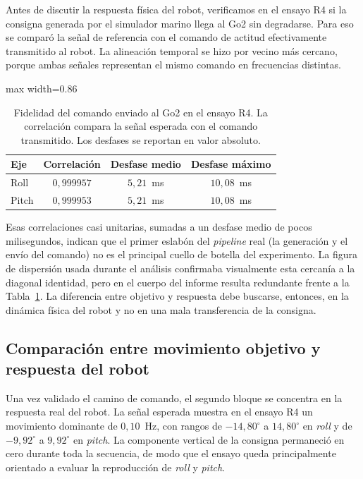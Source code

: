 \documentclass[12pt,a4paper]{report}
\begin{document}
Antes de discutir la respuesta física del robot, verificamos en el ensayo R4
si la consigna generada por el simulador marino llega al Go2 sin degradarse.
Para eso se comparó la señal de referencia con el comando de actitud
efectivamente transmitido al robot. La alineación temporal se hizo por vecino
más cercano, porque ambas señales representan el mismo comando en frecuencias
distintas.

\begin{table}[H]
\centering
\caption{Fidelidad del comando enviado al Go2 en el ensayo R4. La correlación
compara la señal esperada con el comando transmitido. Los desfases se reportan
en valor absoluto.}
\label{tab:lab_command_fidelity}
\begin{adjustbox}{max width=0.86\textwidth}
\begin{tabular}{lccc}
\toprule
Eje & Correlación & Desfase medio & Desfase máximo \\
\midrule
Roll & \(0{,}999957\) & \(5{,}21\)~ms & \(10{,}08\)~ms \\
Pitch & \(0{,}999953\) & \(5{,}21\)~ms & \(10{,}08\)~ms \\
\bottomrule
\end{tabular}
\end{adjustbox}
\end{table}

Esas correlaciones casi unitarias, sumadas a un desfase medio de pocos
milisegundos, indican que el primer eslabón del \textit{pipeline} real (la generación
y el envío del comando) no es el principal cuello de botella del experimento. La
figura de dispersión usada durante el análisis confirmaba visualmente esta
cercanía a la diagonal identidad, pero en el cuerpo del informe resulta
redundante frente a la Tabla~\ref{tab:lab_command_fidelity}. La diferencia
entre objetivo y respuesta debe buscarse, entonces, en la dinámica física del
robot y no en una mala transferencia de la consigna.

\subsection{Comparación entre movimiento objetivo y respuesta del robot}

Una vez validado el camino de comando, el segundo bloque se concentra en la
respuesta real del robot. La señal esperada muestra en el ensayo R4 un
movimiento dominante de
\(0{,}10\)~Hz, con rangos de \(-14{,}80^\circ\) a \(14{,}80^\circ\) en \emph{roll}
y de \(-9{,}92^\circ\) a \(9{,}92^\circ\) en \emph{pitch}. La componente vertical
de la consigna permaneció en cero durante toda la secuencia, de modo que el
ensayo queda principalmente orientado a evaluar la reproducción de \emph{roll} y
\emph{pitch}.
\end{document}

